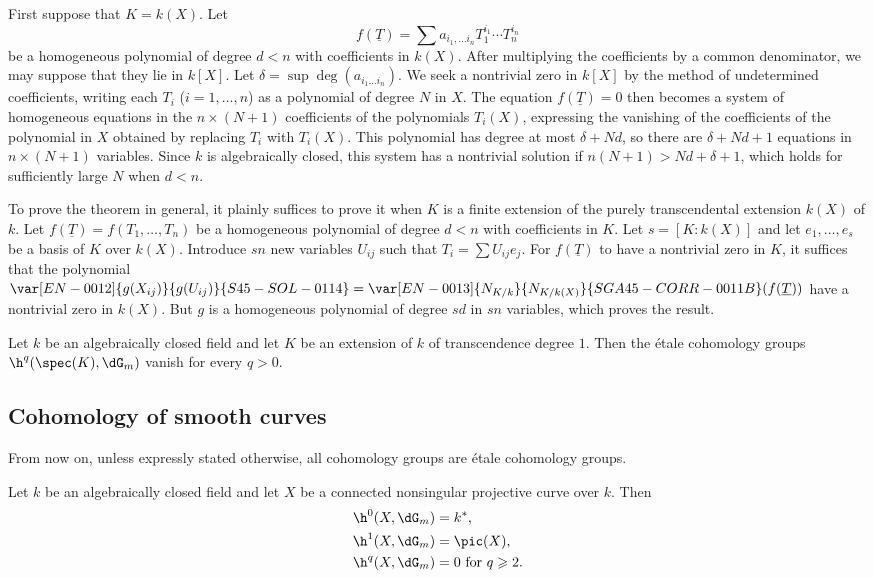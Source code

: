 First suppose that $K=k(X)$. Let
\[
  f(\underline T) = \sum a_{i_1,\dotsc i_n} T_1^{i_1} \dotsm T_n^{i_n}
\]
be a homogeneous polynomial of degree $d<n$ with coefficients in
$k(X)$. After multiplying the coefficients by a common denominator, we
may suppose that they lie in $k[X]$. Let
$\delta=\sup\deg(a_{i_1\dotsc i_n})$. We seek a nontrivial zero in
$k[X]$ by the method of undetermined coefficients, writing each $T_i$
($i=1,\dotsc,n$) as a polynomial of degree $N$ in $X$. The equation
$f(\underline T)=0$ then becomes a system of homogeneous equations in the
$n\times(N+1)$ coefficients of the polynomials $T_i(X)$, expressing the
vanishing of the coefficients of the polynomial in $X$ obtained by
replacing $T_i$ with $T_i(X)$. This polynomial has degree at most
$\delta+Nd$, so there are $\delta+Nd+1$ equations in
$n\times(N+1)$ variables. Since $k$ is algebraically closed, this system
has a nontrivial solution if $n(N+1)>Nd+\delta+1$, which holds for
sufficiently large $N$ when $d<n$.

To prove the theorem in general, it plainly suffices to prove it when
$K$ is a finite extension of the purely transcendental extension
$k(X)$ of $k$. Let $f(\underline T)=f(T_1,\dotsc,T_n)$ be a homogeneous
polynomial of degree $d<n$ with coefficients in $K$. Let
$s=[K:k(X)]$ and let $e_1,\dotsc,e_s$ be a basis of $K$ over $k(X)$.
Introduce $sn$ new variables $U_{ij}$ such that
$T_i=\sum U_{ij}e_j$. For $f(\underline T)$ to have a nontrivial zero in $K$, it
suffices that the polynomial $\var[EN-0012]{g(X_{ij})}{g(U_{ij})}{S45-SOL-0114}=\var[EN-0013]{N_{K/k}}{N_{K/k(X)}}{SGA45-CORR-0011B}(f(\underline T))$ have a nontrivial
zero in $k(X)$. But $g$ is a homogeneous polynomial of degree $sd$ in $sn$
variables, which proves the result.

\begin{corollary}\label{I:3-2-4}
Let $k$ be an algebraically closed field and let $K$ be an extension of
$k$ of transcendence degree $1$. Then the étale cohomology groups
$\h^q(\spec(K),\dG_m)$ vanish for every $q>0$.
\end{corollary}

\subsection{Cohomology of smooth curves}\label{I:3-3}

From now on, unless expressly stated otherwise, all cohomology groups are
étale cohomology groups.

\begin{proposition}\label{I:3-3-1}
Let $k$ be an algebraically closed field and let $X$ be a connected
nonsingular projective curve over $k$. Then
\begin{align*}
  \h^0(X,\dG_m) &= k^* \text{,} \\
  \h^1(X,\dG_m) &= \pic(X) \text{,} \\
  \h^q(X,\dG_m) &= 0 \text{ for $q\geqslant 2$.}
\end{align*}
\end{proposition}

